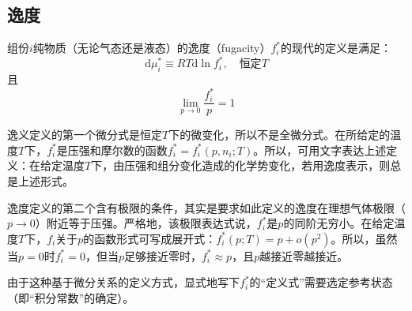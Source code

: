 \documentclass[main.tex]{subfiles}
\begin{document}
\subsection{逸度}
组份$i$纯物质（无论气态还是液态）的逸度（fugacity）$f_i^*$的现代的定义是满足：
\[\mathrm{d}\mu_i^*\equiv RT\mathrm{d}\ln f_i^*,\quad\text{恒定$T$}\]
且
\[\lim_{p\to 0}\frac{f_i^*}{p}=1\]

逸义定义的第一个微分式是恒定$T$下的微变化，所以不是全微分式。在所给定的温度$T$下，$f_i^*$是压强和摩尔数的函数$f_i^*=f_i^*\left(p,n_i;T\right)$。所以，可用文字表达上述定义：在给定温度$T$下，由压强和组分变化造成的化学势变化，若用逸度表示，则总是上述形式。

逸度定义的第二个含有极限的条件，其实是要求如此定义的逸度在理想气体极限（$p\rightarrow 0$）附近等于压强。严格地，该极限表达式说，$f_i^*$是$p$的同阶无穷小。在给定温度$T$下，$f_i$关于$p$的函数形式可写成展开式：$f_i^*\left(p;T\right)=p+o\left(p^2\right)$。所以，虽然当$p=0$时$f_i^*=0$，但当$p$足够接近零时，$f_i^*\approx p$，且$p$越接近零越接近。

由于这种基于微分关系的定义方式，显式地写下$f_i^*$的“定义式”需要选定参考状态（即“积分常数”的确定）。
\end{document}

